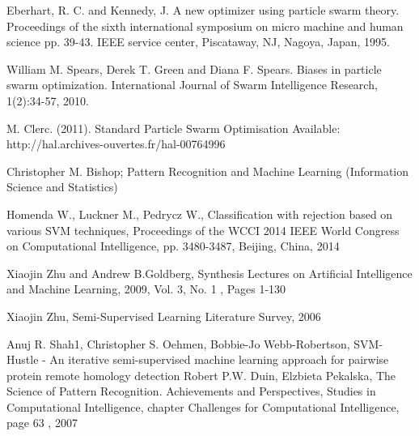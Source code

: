\documentclass{mini}
\begin{document}
\begin{thebibliography}{1}
    
    Eberhart, R. C. and Kennedy, J. A new optimizer using particle swarm theory. Proceedings of the sixth international symposium on micro machine and human science pp. 39-43. IEEE service center, Piscataway, NJ, Nagoya, Japan, 1995.
    
    
    
    
    William M. Spears, Derek T. Green and Diana F. Spears. Biases in particle swarm optimization. International Journal of Swarm Intelligence Research, 1(2):34-57, 2010.
    
    
    
    
    M. Clerc. (2011). Standard Particle Swarm Optimisation Available: http://hal.archives-ouvertes.fr/hal-00764996 
    
     Christopher M. Bishop; Pattern Recognition and Machine Learning (Information Science and Statistics)
    
	 Homenda W., Luckner M., Pedrycz W., Classification with rejection based on various SVM techniques, Proceedings of the WCCI 2014 IEEE World Congress on Computational Intelligence, pp. 3480-3487, Beijing, China, 2014     
    
	 Xiaojin Zhu and Andrew B.Goldberg, Synthesis Lectures on Artificial Intelligence and Machine Learning, 2009, Vol. 3, No. 1 , Pages 1-130    
	
     Xiaojin Zhu, Semi-Supervised Learning Literature Survey, 2006

	
	 Anuj R. Shah1, Christopher S. Oehmen, Bobbie-Jo Webb-Robertson, SVM-Hustle - An iterative semi-supervised machine learning approach for pairwise protein remote homology detection 
	 Robert P.W. Duin, Elzbieta Pekalska, The Science of Pattern Recognition. Achievements and Perspectives, Studies in Computational Intelligence, chapter Challenges for Computational Intelligence, page 63 , 2007
	
\end{thebibliography}
\makestatement
\end{document}
